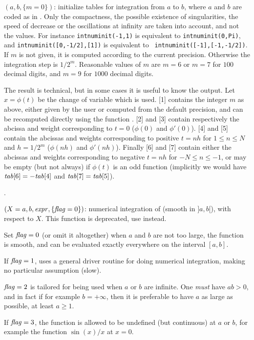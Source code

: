 $(a,b,\{m=0\})$: initialize tables for integration from
$a$ to $b$, where $a$ and $b$ are coded as in . Only the
compactness, the possible existence of singularities, the speed of decrease
or the oscillations at infinity are taken into account, and not the values.
For instance {\tt intnuminit(-1,1)} is equivalent to {\tt intnuminit(0,Pi)},
and {\tt intnuminit([0,-1/2],[1])} is equivalent to {\tt
intnuminit([-1],[-1,-1/2])}. If $m$ is not given, it is computed according to
the current precision. Otherwise the integration step is $1/2^m$. Reasonable
values of $m$ are $m=6$ or $m=7$ for $100$ decimal digits, and $m=9$ for
$1000$ decimal digits.

The result is technical, but in some cases it is useful to know the output.
Let $x=\phi(t)$ be the change of variable which is used. [1] contains
the integer $m$ as above, either given by the user or computed from the default
precision, and can be recomputed directly using the function .
[2] and [3] contain respectively the abcissa and weight
corresponding to $t=0$ ($\phi(0)$ and $\phi'(0)$). [4] and
[5] contain the abcissas and weights corresponding to positive
$t=nh$ for $1\le n\le N$ and $h=1/2^m$ ($\phi(nh)$ and $\phi'(nh)$). Finally
[6] and [7] contain either the abcissas and weights
corresponding to negative $t=nh$ for $-N\le n\le -1$, or may be empty (but
not always) if $\phi(t)$ is an odd function (implicitly we would have
$\hbox{\it tab\/}[6]=-\hbox{\it tab\/}[4]$ and $\hbox{\it tab\/}[7]=\hbox{\it tab\/}[5]$).

.

$(X=a,b,\hbox{\it expr\/},\{\hbox{\it f\kern0pt lag\/}=0\})$: numerical integration of
 (smooth in $]a,b[$), with respect to $X$. This function is
deprecated, use  instead.

Set $\hbox{\it f\kern0pt lag\/}=0$ (or omit it altogether) when $a$ and $b$ are not too large, the
function is smooth, and can be evaluated exactly everywhere on the interval
$[a,b]$.

If $\hbox{\it f\kern0pt lag\/}=1$, uses a general driver routine for doing numerical integration,
making no particular assumption (slow).

$\hbox{\it f\kern0pt lag\/}=2$ is tailored for being used when $a$ or $b$ are infinite. One
\emph{must} have $ab>0$, and in fact if for example $b=+\infty$, then it is
preferable to have $a$ as large as possible, at least $a\ge1$.

If $\hbox{\it f\kern0pt lag\/}=3$, the function is allowed to be undefined (but continuous) at $a$
or $b$, for example the function $\sin(x)/x$ at $x=0$.

